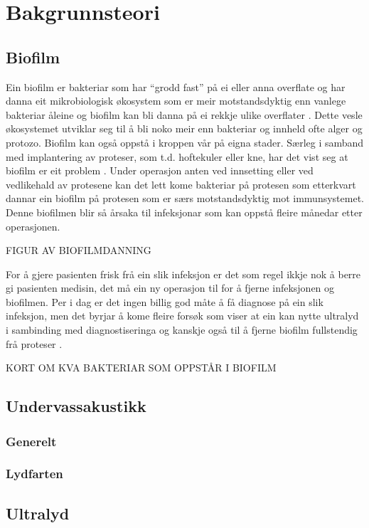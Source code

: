 \section{Bakgrunnsteori}
\subsection{Biofilm}
Ein biofilm er bakteriar som har ``grodd fast'' på ei eller anna overflate og har danna eit mikrobiologisk økosystem som er meir motstandsdyktig enn vanlege bakteriar åleine og biofilm kan bli danna på ei rekkje ulike overflater \cite{biofilm}\cite{biofilm2}. Dette vesle økosystemet utviklar seg til å bli noko meir enn bakteriar og innheld ofte alger og protozo. Biofilm kan også oppstå i kroppen vår på eigna stader. Særleg i samband med implantering av proteser, som t.d. hoftekuler eller kne, har det vist seg at biofilm er eit problem \cite{ultraprotese}. Under operasjon anten ved innsetting eller ved vedlikehald av protesene kan det lett kome bakteriar på protesen som etterkvart dannar ein biofilm på protesen som er særs motstandsdyktig mot immunsystemet. Denne biofilmen blir så årsaka til infeksjonar som kan oppstå fleire månedar etter operasjonen. 

FIGUR AV BIOFILMDANNING

For å gjere pasienten frisk frå ein slik infeksjon er det som regel ikkje nok å berre gi pasienten medisin, det må ein ny operasjon til for å fjerne infeksjonen og biofilmen\cite{infection}. Per i dag er det ingen billig god måte å få diagnose på ein slik infeksjon, men det byrjar å kome fleire forsøk som viser at ein kan nytte ultralyd i sambinding med diagnostiseringa og kanskje også til å fjerne biofilm fullstendig frå proteser \cite{ultraprotese}.

KORT OM KVA BAKTERIAR SOM OPPSTÅR I BIOFILM
\subsection{Undervassakustikk}
\subsubsection*{Generelt}

\subsubsection*{Lydfarten}

\subsection{Ultralyd}

